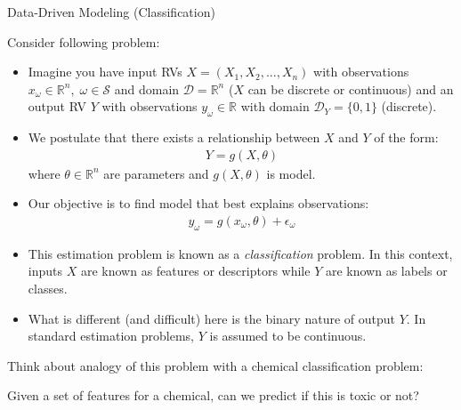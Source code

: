 \documentclass[9pt]{beamer}
\begin{document}

\begin{frame}{Data-Driven Modeling (Classification)}


Consider following problem:
\begin{itemize}
\item Imagine you have input RVs $X=(X_1,X_2,...,X_n)$ with observations $x_\omega\in \mathbb{R}^n,\; \omega \in \mathcal{S}$ and domain $\mathcal{D}=\mathbb{R}^n$ ($X$ can be discrete or continuous) and an output RV $Y$ with observations $y_{\omega}\in \mathbb{R}$ with domain $\mathcal{D}_Y=\{0,1\}$ (discrete). 
 
\item We postulate that there exists a relationship between $X$ and $Y$ of the form:
\begin{align*}
Y=g(X,\theta)
\end{align*}
where $\theta \in \mathbb{R}^n$ are parameters and $g(X,\theta)$ is model.  

\item Our objective is to find model that best explains observations:
\begin{align*}
y_\omega=g(x_\omega,\theta)+\epsilon_\omega
\end{align*}
\item This estimation problem is known as a {\em classification} problem.  In this context, inputs $X$ are known as features or descriptors while $Y$ are known as labels or classes.  
\item What is different (and difficult) here is the binary nature of output $Y$. In standard estimation problems, $Y$ is assumed to be continuous. 

\end{itemize}

Think about analogy of this problem with a chemical classification problem: 
\begin{block}{}
Given a set of features for a chemical, can we predict if this is toxic or not? 
\end{block}


\end{frame}


\end{document}
